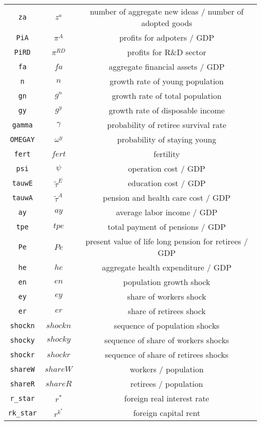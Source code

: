 \begin{center}
\begin{longtable}{ccc}
\texttt{za} & ${z^a}$ & number of aggregate new ideas / number of adopted goods\\
\texttt{PiA} & ${\pi^{A}}$ & profits for adpoters / GDP\\
\texttt{PiRD} & ${\pi^{RD}}$ & profits for R\&D sector\\
\texttt{fa} & ${fa}$ & aggregate financial assets / GDP\\
\texttt{n} & ${n}$ & growth rate of young population\\
\texttt{gn} & ${g^n}$ & growth rate of total population\\
\texttt{gy} & ${g^y}$ & growth rate of disposable income\\
\texttt{gamma} & ${\gamma}$ & probability of retiree survival rate\\
\texttt{OMEGAY} & ${\omega^{y}}$ & probability of staying young\\
\texttt{fert} & ${fert}$ & fertility\\
\texttt{psi} & ${\psi}$ & operation cost / GDP\\
\texttt{tauwE} & $\tilde{\tau}^E$ & education cost / GDP\\
\texttt{tauwA} & $\tilde{\tau}^A$ & pension and health care cost / GDP\\
\texttt{ay} & ${ay}$ & average labor income / GDP\\
\texttt{tpe} & ${tpe}$ & total payment of pensions / GDP\\
\texttt{Pe} & ${Pe}$ & present value of life long pension for retirees / GDP\\
\texttt{he} & ${he}$ & aggregate health expenditure / GDP\\
\texttt{en} & ${en}$ & population growth shock\\
\texttt{ey} & ${ey}$ & share of workers shock\\
\texttt{er} & ${er}$ & share of retirees shock\\
\texttt{shockn} & ${shockn}$ & sequence of population shocks\\
\texttt{shocky} & ${shocky}$ & sequence of share of workers shocks\\
\texttt{shockr} & ${shockr}$ & sequence of share of retirees shocks\\
\texttt{shareW} & ${shareW}$ & workers / population\\
\texttt{shareR} & ${shareR}$ & retirees / population\\
\texttt{r\_star} & ${r^*}$ & foreign real interest rate\\
\texttt{rk\_star} & ${r^k^*}$ & foreign capital rent\\

\end{longtable}
\end{center}
